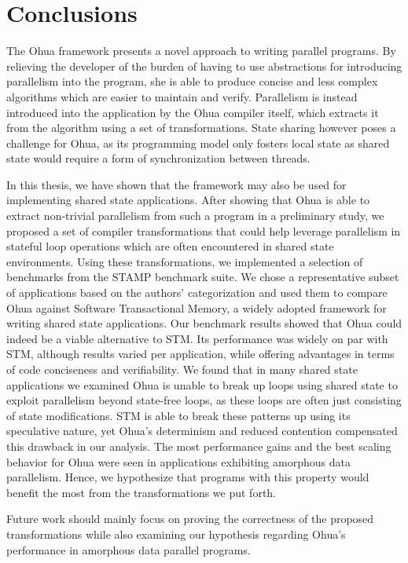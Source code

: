 %
\chapter{Conclusions}
\label{sec:conclusion}

The Ohua framework presents a novel approach to writing parallel programs.
By relieving the developer of the burden of having to use abstractions for introducing parallelism into the program, she is able to produce concise and less complex algorithms which are easier to maintain and verify.
Parallelism is instead introduced into the application by the Ohua compiler itself, which extracts it from the algorithm using a set of transformations.
State sharing however poses a challenge for Ohua, as its programming model only fosters local state as shared state would require a form of synchronization between threads.

In this thesis, we have shown that the framework may also be used for implementing shared state applications.
After showing that Ohua is able to extract non-trivial parallelism from such a program in a preliminary study, we proposed a set of compiler transformations that could help leverage parallelism in stateful loop operations which are often encountered in shared state environments.
Using these transformations, we implemented a selection of benchmarks from the STAMP benchmark suite.
We chose a representative subset of applications based on the authors' categorization and used them to compare Ohua against Software Transactional Memory, a widely adopted framework for writing shared state applications.
Our benchmark results showed that Ohua could indeed be a viable alternative to STM.
Its performance was widely on par with STM, although results varied per application, while offering advantages in terms of code conciseness and verifiability.
We found that in many shared state applications we examined Ohua is unable to break up loops using shared state to exploit parallelism beyond state-free loops, as these loops are often just consisting of state modifications.
STM is able to break these patterns up using its speculative nature, yet Ohua's determinism and reduced contention compensated this drawback in our analysis.
The most performance gains and the best scaling behavior for Ohua were seen in applications exhibiting amorphous data parallelism.
Hence, we hypothesize that programs with this property would benefit the most from the transformations we put forth.

Future work should mainly focus on proving the correctness of the proposed transformations while also examining our hypothesis regarding Ohua's performance in amorphous data parallel programs.
